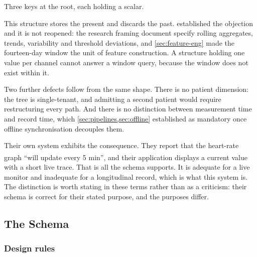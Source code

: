 \documentclass[12pt,a4paper,oneside]{report}
\newcommand{\bq}[1]{``#1''\textsuperscript{\dag}}
\begin{document}
Three keys at the root, each holding a scalar.

This structure stores the present and discards the past.  established the objection and it is not reopened: the research framing document specify rolling aggregates, trends, variability and threshold deviations, and \cref{sec:feature-eng} made the fourteen-day window the unit of feature construction. A structure holding one value per channel cannot answer a window query, because the window does not exist within it.

Two further defects follow from the same shape. There is no patient dimension: the tree is single-tenant, and admitting a second patient would require restructuring every path. And there is no distinction between measurement time and record time, which \cref{sec:pipelines,sec:offline} established as mandatory once offline synchronisation decouples them.

Their own system exhibits the consequence. They report that the heart-rate graph \bq{will update every 5 min}, and their application displays a current value with a short live trace. That is all the schema supports. It is adequate for a live monitor and inadequate for a longitudinal record, which is what this system is. The distinction is worth stating in these terms rather than as a criticism: their schema is correct for their stated purpose, and the purposes differ.

\subsection{The Schema}\label{sec:schema-design}

\subsubsection{Design rules}
\end{document}
